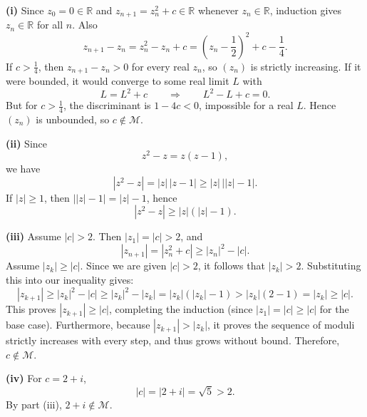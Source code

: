 \begin{solution}
\textbf{(i)} Since $z_0=0\in\mathbb{R}$ and $z_{n+1}=z_n^2+c\in\mathbb{R}$ whenever $z_n\in\mathbb{R}$, induction gives $z_n\in\mathbb{R}$ for all $n$. Also
\[
z_{n+1}-z_n=z_n^2-z_n+c=\left(z_n-\frac12\right)^2+c-\frac14.
\]
If $c>\frac14$, then $z_{n+1}-z_n>0$ for every real $z_n$, so $(z_n)$ is strictly increasing. If it were bounded, it would converge to some real limit $L$ with
\[
L=L^2+c \qquad\Rightarrow\qquad L^2-L+c=0.
\]
But for $c>\frac14$, the discriminant is $1-4c<0$, impossible for a real $L$. Hence $(z_n)$ is unbounded, so $c\notin\mathcal M$.

\textbf{(ii)} Since
\[
z^2-z=z(z-1),
\]
we have
\[
|z^2-z|=|z|\,|z-1|\ge |z|\,\bigl||z|-1\bigr|.
\]
If $|z|\ge1$, then $\bigl||z|-1\bigr|=|z|-1$, hence
\[
|z^2-z|\ge |z|(|z|-1).
\]

\textbf{(iii)} Assume $|c|>2$. Then $|z_1|=|c|>2$, and
\[
|z_{n+1}|=|z_n^2+c|\ge |z_n|^2-|c|.
\]
Assume $|z_k|\ge |c|$. Since we are given $|c|>2$, it follows that $|z_k|>2$. Substituting this into our inequality gives:
\[
|z_{k+1}|\ge |z_k|^2-|c|\ge |z_k|^2-|z_k|=|z_k|(|z_k|-1) > |z_k|(2 - 1) = |z_k| \ge |c|.
\]
This proves $|z_{k+1}| \ge |c|$, completing the induction (since $|z_1| = |c| \ge |c|$ for the base case). Furthermore, because $|z_{k+1}| > |z_k|$, it proves the sequence of moduli strictly increases with every step, and thus grows without bound. Therefore, $c\notin\mathcal M$.

\textbf{(iv)} For $c=2+i$,
\[
|c|=|2+i|=\sqrt5>2.
\]
By part (iii), $2+i\notin\mathcal M$.

\begin{center}
\end{center}
\end{solution}


